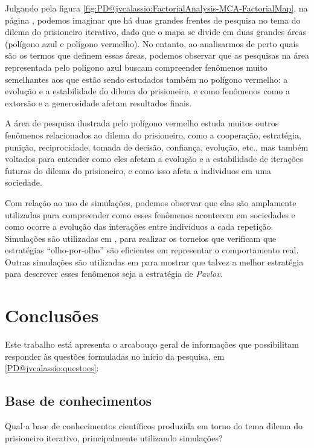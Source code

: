 Julgando pela figura \ref{fig:PD@jvcalassio:FactorialAnalysis-MCA-FactorialMap}, na página \pageref{fig:PD@jvcalassio:FactorialAnalysis-MCA-FactorialMap}, podemos imaginar que há duas grandes frentes de pesquisa no tema do dilema do prisioneiro iterativo, dado que o mapa se divide em duas grandes áreas (polígono azul e polígono vermelho). No entanto, ao analisarmos de perto quais são os termos que definem essas áreas, podemos observar que as pesquisas na área representada pelo polígono azul buscam compreender fenômenos muito semelhantes aos que estão sendo estudados também no polígono vermelho: a evolução e a estabilidade do dilema do prisioneiro, e como fenômenos como a extorsão e a generosidade afetam resultados finais. 

A área de pesquisa ilustrada pelo polígono vermelho estuda muitos outros fenômenos relacionados ao dilema do prisioneiro, como a cooperação, estratégia, punição, reciprocidade, tomada de decisão, confiança, evolução, etc., mas também voltados para entender como eles afetam a evolução e a estabilidade de iterações futuras do dilema do prisioneiro, e como isso afeta a individuos em uma sociedade.

Com relação ao uso de simulações, podemos observar que elas são amplamente utilizadas para compreender como esses fenômenos acontecem em sociedades e como ocorre a evolução das interações entre indivíduos a cada repetição. Simulações são utilizadas em \cite{axelrod_evolution_1981}, para realizar os torneios que verificam que estratégias ``olho-por-olho'' são eficientes em representar o comportamento real. Outras simulações são utilizadas em \cite{nowak_strategy_1993} para mostrar que talvez a melhor estratégia para descrever esses fenômenos seja a estratégia de \textit{Pavlov}.

\section{Conclusões}

Este trabalho está apresenta o arcabouço geral de informações que possibilitam responder às  questões formuladas no início da pesquisa, em \ref{PD@jvcalassio:questoes}:

\subsection{Base de conhecimentos}

Qual a base de conhecimentos científicos produzida em torno do tema dilema do prisioneiro iterativo, principalmente utilizando simulações? 
 
